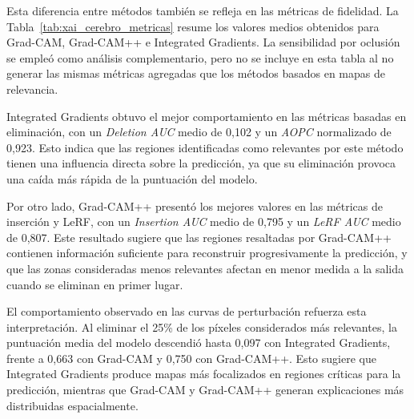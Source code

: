 Esta diferencia entre métodos también se refleja en las métricas de fidelidad. La Tabla~\ref{tab:xai_cerebro_metricas} resume los valores medios obtenidos para Grad-CAM, Grad-CAM++ e Integrated Gradients. La sensibilidad por oclusión se empleó como análisis complementario, pero no se incluye en esta tabla al no generar las mismas métricas agregadas que los métodos basados en mapas de relevancia.

\begin{table}[h]
\centering
\caption{Resumen cuantitativo de las métricas de fidelidad para los métodos de explicabilidad aplicados al modelo de segmentación cerebral.}
\label{tab:xai_cerebro_metricas}
\end{table}

Integrated Gradients obtuvo el mejor comportamiento en las métricas basadas en eliminación, con un \textit{Deletion AUC} medio de 0,102 y un \textit{AOPC} normalizado de 0,923. Esto indica que las regiones identificadas como relevantes por este método tienen una influencia directa sobre la predicción, ya que su eliminación provoca una caída más rápida de la puntuación del modelo.

Por otro lado, Grad-CAM++ presentó los mejores valores en las métricas de inserción y LeRF, con un \textit{Insertion AUC} medio de 0,795 y un \textit{LeRF AUC} medio de 0,807. Este resultado sugiere que las regiones resaltadas por Grad-CAM++ contienen información suficiente para reconstruir progresivamente la predicción, y que las zonas consideradas menos relevantes afectan en menor medida a la salida cuando se eliminan en primer lugar.

El comportamiento observado en las curvas de perturbación refuerza esta interpretación. Al eliminar el 25\% de los píxeles considerados más relevantes, la puntuación media del modelo descendió hasta 0,097 con Integrated Gradients, frente a 0,663 con Grad-CAM y 0,750 con Grad-CAM++. Esto sugiere que Integrated Gradients produce mapas más focalizados en regiones críticas para la predicción, mientras que Grad-CAM y Grad-CAM++ generan explicaciones más distribuidas espacialmente.

